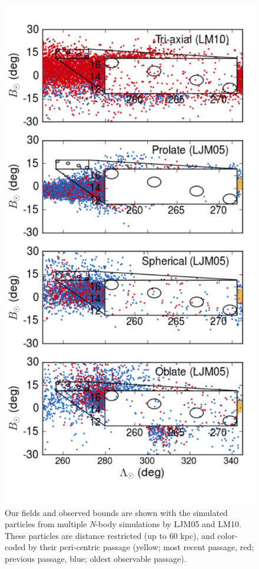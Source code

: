 	\begin{figure}[t!]
		\includegraphics[width=\columnwidth]{chapter1/law_spatial.pdf}
		\caption{Our fields and observed bounds are shown with the simulated particles from multiple \textit{N}-body simulations by LJM05 and LM10. These particles are distance restricted (up to 60 kpc), and color-coded by their peri-centric passage (yellow; most recent passage, red; previous passage, blue; oldest observable passage).}
		\label{fig:law-spatial}
	\end{figure}

